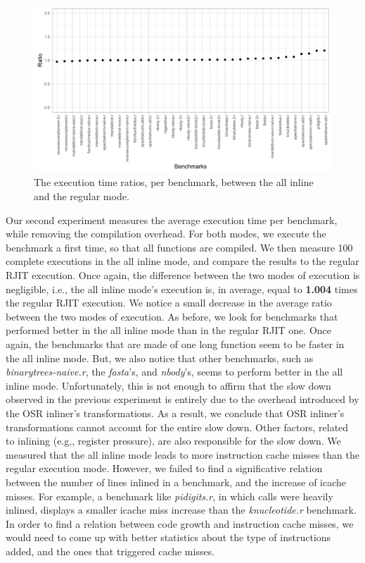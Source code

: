 \clearpage
\begin{landscape}
\begin{figure}[h]
    \includegraphics[scale=0.9]{Figures/execReal5}
    \caption{The execution time ratios, per benchmark, between the all inline and the regular mode.}
    \label{fig:execreal5}
\end{figure}
\end{landscape}
\clearpage


Our second experiment measures the average execution time per benchmark, while removing the compilation overhead.
For both modes, we execute the benchmark a first time, so that all functions are compiled. 
We then measure 100 complete executions in the all inline mode, and compare the results to the regular RJIT execution.
Once again, the difference between the two modes of execution is negligible, i.e., the all inline mode's execution is, in average, equal to \textbf{1.004} times the regular RJIT execution.
We notice a small decrease in the average ratio between the two modes of execution.
As before, we look for benchmarks that performed better in the all inline mode than in the regular RJIT one.
Once again, the benchmarks that are made of one long function seem to be faster in the all inline mode.
But, we also notice that other benchmarks, such as \textit{binarytrees-naive.r}, the \textit{fasta}'s, and \textit{nbody}'s, seems to perform better in the all inline mode.
Unfortunately, this is not enough to affirm that the slow down observed in the previous experiment is entirely due to the overhead introduced by the OSR inliner's transformations.
As a result, we conclude that OSR inliner's transformations cannot account for the entire slow down.
Other factors, related to inlining (e.g., register pressure), are also responsible for the slow down.
We measured that the all inline mode leads to more instruction cache misses than the regular execution mode.
However, we failed to find a significative relation between the number of lines inlined in a benchmark, and the increase of icache misses.
For example, a benchmark like \textit{pidigits.r}, in which calls were heavily inlined, displays a smaller icache miss increase than the \textit{knucleotide.r} benchmark.
In order to find a relation between code growth and instruction cache misses, we would need to come up with better statistics about the type of instructions added, and the ones that triggered cache misses.\\

